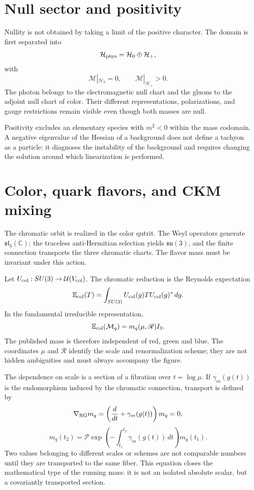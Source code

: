 \section{Null sector and positivity}

Nullity is not obtained by taking a limit of the positive character. The domain
is first separated into
\[
 \mathcal H_{\rm phys}=\mathcal H_0\oplus\mathcal H_+,
\]
with
\[
 \mathcal M|_{\mathcal H_0}=0,
 \qquad
 \mathcal M|_{\mathcal H_+}>0.
\]
The photon belongs to the electromagnetic null chart and the gluons to the adjoint
null chart of color. Their different representations, polarizations, and
gauge restrictions remain visible even though both masses are null.

Positivity excludes an elementary species with \(m^2<0\) within the
mass codomain. A negative eigenvalue of the Hessian of a background does not define a
tachyon as a particle: it diagnoses the instability of the background and requires changing
the solution around which linearization is performed.

\section{Color, quark flavors, and CKM mixing}

The chromatic orbit is realized in the color qutrit. The Weyl operators
generate \(\mathfrak{sl}_3(\mathbb C)\); the traceless anti-Hermitian selection
yields \(\mathfrak{su}(3)\), and the finite connection transports the three
chromatic charts. The flavor mass must be invariant under this action.

Let \(U_{\rm col}:SU(3)\to\mathcal U(V_{\rm col})\). The chromatic reduction
is the Reynolds expectation
\[
 \mathbb E_{\rm col}(T)
 =\int_{SU(3)}U_{\rm col}(g)T U_{\rm col}(g)^*\,dg.
\]
In the fundamental irreducible representation,
\[
 \mathbb E_{\rm col}(\mathcal M_q)
 =m_q(\mu,\mathscr R)I_3.
\]
The published mass is therefore independent of red, green and blue. The
coordinates \(\mu\) and \(\mathscr R\) identify the scale and renormalization
scheme; they are not hidden ambiguities and must always accompany the
figure.

The dependence on scale is a section of a fibration over
\(t=\log\mu\). If \(\gamma_m(g(t))\) is the endomorphism induced by the
chromatic connection, transport is defined by
\[
 \nabla_{\rm RG}m_q
 =\left(\frac{d}{dt}+\gamma_m(g(t))\right)m_q=0,
\]
\[
 m_q(t_2)
 =\mathcal P\exp\!\left(-\int_{t_1}^{t_2}
 \gamma_m(g(t))\,dt\right)m_q(t_1).
\]
Two values belonging to different scales or schemes are not comparable
numbers until they are transported to the same fiber. This equation closes the
mathematical type of the running mass: it is not an isolated absolute scalar, but
a covariantly transported section.


